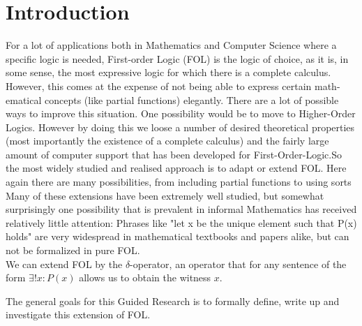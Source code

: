 \section{Introduction}

For a lot of applications both in Mathematics and Computer Science where a
specific logic is needed, First-order Logic (FOL) is the logic of choice, as it is,
in some sense, the most expressive logic for which there is a complete calculus.
However, this comes at the expense of not being able to express certain math-
ematical concepts (like partial functions) elegantly. 
There are a lot of possible ways to improve this situation. One possibility would be to move to Higher-Order Logics. However by doing this we loose a number of desired theoretical properties (most importantly the existence of a complete calculus) and the fairly large amount of computer support that has been developed for First-Order-Logic.So the most widely studied and realised approach is to adapt or extend FOL.
Here again there are many possibilities, from including partial functions %
to using sorts %
Many of these extensions have been extremely well studied, %
but somewhat surprisingly one possibility that is prevalent in informal Mathematics has received relatively little attention:
Phrases like "let x be the unique element such that P(x) holds" are very widespread in mathematical textbooks and papers alike, but can not be formalized in pure FOL.\\
 We can extend FOL by the $\delta$-operator, an operator that for any sentence of the form $\exists! x:P (x)$ allows us to obtain the witness $x$.
 

The general goals for this Guided Research is to formally define, write up and
investigate this extension of FOL.